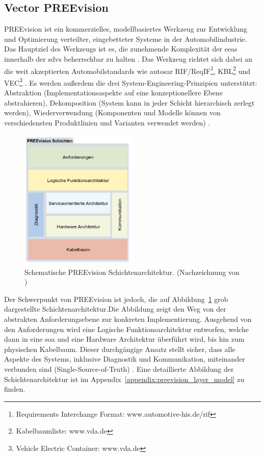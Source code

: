 \subsection{Vector PREEvision}
PREEvision ist ein kommerzielles, modellbasiertes Werkzeug zur Entwicklung und Optimierung verteilter, eingebetteter Systeme in der Automobilindustrie. Das Hauptziel des Werkzeugs ist es, die zunehmende Komplexität der \glspl{eea} innerhalb der \glspl{sdv} beherrschbar zu halten \cite{askaripoor2022architecture}. Das  Werkzeug richtet sich dabei an die weit akzeptierten Automobilstandards wie \gls{autosar} RIF/ReqIF\footnote{Requirements Interchange Format: www.automotive-his.de/rif}, KBL\footnote{Kabelbaumliste: www.vda.de
} und VEC\footnote{Vehicle Electric Container: www.vda.de} \cite{schauffele2016architectural}. Es werden außerdem die drei System-Engineering-Prinzipien unterstützt: Abstraktion (Implementationsaspekte auf eine konzeptionellere Ebene abstrahieren), Dekomposition (System kann in jeder Schicht hierarchisch zerlegt werden), Wiederverwendung (Komponenten und Modelle können von verschiedensten Produktlinien und Varianten verwendet werden) \cite{schauffele2016architectural}.

\begin{figure}
  \centering
  \includegraphics[width=0.5\textwidth]{figures/PREEVISION_LAYER.drawio.png}
  \caption{Schematische PREEvision Schichtenarchitektur. (Nachzeichnung von \cite{vectorinformatikgmbhpreevision})}
  \label{fig:preevision_schicht}
\end{figure}

Der Schwerpunkt von PREEvision ist jedoch, die auf Abbildung~\ref{fig:preevision_schicht} grob dargestellte Schichtenarchitektur.Die Abbildung zeigt den Weg von der abstrakten Anforderungsebene zur konkreten Implementierung. Ausgehend von den Anforderungen wird eine Logische Funktionsarchitektur entworfen, welche dann in eine \gls{soa} und eine Hardware Architektur überführt wird, bis hin zum physischen Kabelbaum. Dieser durchgängige Ansatz stellt sicher, dass alle Aspekte des Systems, inklusive Diagnostik und Kommunikation, miteinander verbunden sind (Single-Source-of-Truth) \cite{schauffele2016architectural}. Eine detaillierte Abbildung der Schichtenarchitektur ist im Appendix~\ref{appendix:preevision_layer_model} zu finden.


